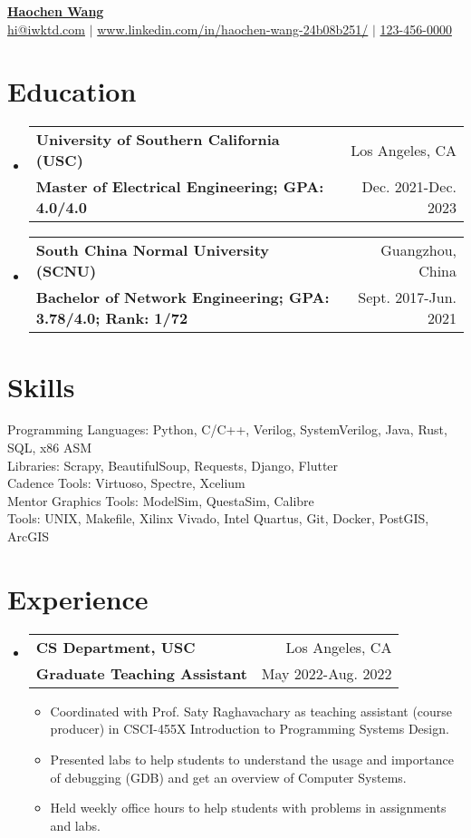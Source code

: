 \documentclass[letterpaper,11pt]{article}
\makeatletter
\newcommand{\resumeItemOne}[1]{
  \item\small{#1}
}
\newcommand{\resumeSubheading}[4]{
  \vspace{-1pt}\item
    \begin{tabular*}{0.97\textwidth}[t]{l@{\extracolsep{\fill}}r}
      \textbf{#1} & #2 \\
      \textbf{\small#3} & \small{#4} \\
    \end{tabular*}\vspace{-5pt}
}
\newcommand{\resumeSubHeadingListStart}{\begin{itemize}[leftmargin=*]}
\newcommand{\resumeSubHeadingListEnd}{\end{itemize}}
\newcommand{\resumeItemListStart}{\begin{itemize}}
\newcommand{\resumeItemListEnd}{\end{itemize}\vspace{-5pt}}
\makeatother
\begin{document}
\textbf{\href{https://www.linkedin.com/in/haochen-wang-24b08b251/}{\Large {Haochen Wang}}} \\
{
    \href{mailto:{hi@iwktd.com}}{{hi@iwktd.com}} $|$ \href{https://www.linkedin.com/in/haochen-wang-24b08b251/}{www.linkedin.com/in/haochen-wang-24b08b251/} $|$ \href{tel:123-456-0000}{123-456-0000}
}
\section{Education}
\resumeSubHeadingListStart
\resumeSubheading
    {University of Southern California (USC)}{Los Angeles, CA}
    {Master of Electrical Engineering; GPA: 4.0/4.0
}{Dec. 2021-Dec. 2023}
\resumeSubheading
    {South China Normal University (SCNU)}{Guangzhou, China}
    {Bachelor of Network Engineering; GPA: 3.78/4.0; Rank: 1/72
}{Sept. 2017-Jun. 2021}
\resumeSubHeadingListEnd



\section{Skills}
Programming Languages: Python, C/C++, Verilog, SystemVerilog, Java, Rust, SQL, x86 ASM\\ 
Libraries: Scrapy, BeautifulSoup, Requests, Django, Flutter\\ 
Cadence Tools: Virtuoso, Spectre, Xcelium\\ 
Mentor Graphics Tools: ModelSim, QuestaSim, Calibre\\ 
Tools: UNIX, Makefile, Xilinx Vivado, Intel Quartus, Git, Docker, PostGIS, ArcGIS\\ 


\section{Experience}
\resumeSubHeadingListStart
\resumeSubheading
    {CS Department, USC}{Los Angeles, CA}
    {Graduate Teaching Assistant}{May 2022-Aug. 2022}
\resumeItemListStart
	\resumeItemOne{Coordinated with Prof. Saty Raghavachary as teaching assistant (course producer) in CSCI-455X Introduction to Programming Systems Design.}
	\resumeItemOne{Presented labs to help students to understand the usage and importance of debugging (GDB) and get an overview of Computer Systems.}
	\resumeItemOne{Held weekly office hours to help students with problems in assignments and labs.}
\resumeItemListEnd
\resumeSubHeadingListEnd
\end{document}
